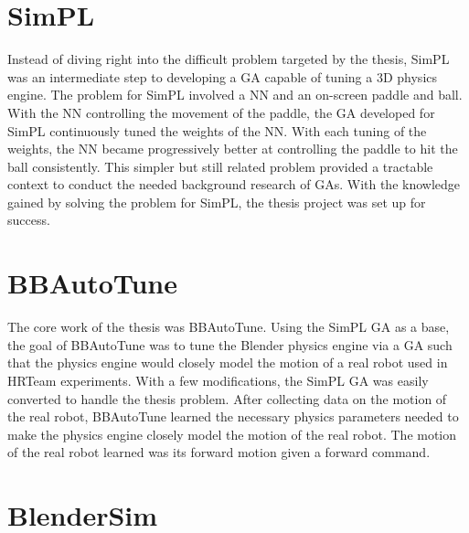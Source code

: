 
\section{SimPL}

Instead of diving right into the difficult problem targeted by the thesis, SimPL was an intermediate step to developing a GA capable of tuning a 3D physics engine. The problem for SimPL involved a NN and an on-screen paddle and ball. With the NN controlling the movement of the paddle, the GA developed for SimPL continuously tuned the weights of the NN. With each tuning of the weights, the NN became progressively better at controlling the paddle to hit the ball consistently. This simpler but still related problem provided a tractable context to conduct the needed background research of GAs. With the knowledge gained by solving the problem for SimPL, the thesis project was set up for success.    

\section{BBAutoTune}

The core work of the thesis was BBAutoTune. Using the SimPL GA as a base, the goal of BBAutoTune was to tune the Blender physics engine via a GA such that the physics engine would closely model the motion of a real robot used in HRTeam experiments.  With a few modifications, the SimPL GA was easily converted to handle the thesis problem. After collecting data on the motion of the real robot, BBAutoTune learned the necessary physics parameters needed to make the physics engine closely model the motion of the real robot. The motion of the real robot learned was its forward motion given a forward command.      

\section{BlenderSim}


